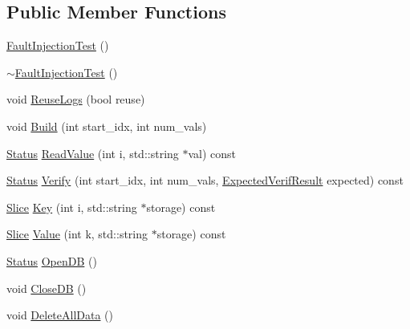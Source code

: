 \subsection*{Public Member Functions}
\begin{DoxyCompactItemize}
\item 
\mbox{\hyperlink{classleveldb_1_1_fault_injection_test_ae54ddb4aaf6bb2fb8dbd688164dd87f4}{Fault\+Injection\+Test}} ()
\item 
\mbox{\hyperlink{classleveldb_1_1_fault_injection_test_a547ba383f26947152eb0c5045d5965c1}{$\sim$\+Fault\+Injection\+Test}} ()
\item 
void \mbox{\hyperlink{classleveldb_1_1_fault_injection_test_ad89bbc5e5caf77e0c7a983005afe1dad}{Reuse\+Logs}} (bool reuse)
\item 
void \mbox{\hyperlink{classleveldb_1_1_fault_injection_test_aa387332893f14da9bdec0751e151f282}{Build}} (int start\+\_\+idx, int num\+\_\+vals)
\item 
\mbox{\hyperlink{classleveldb_1_1_status}{Status}} \mbox{\hyperlink{classleveldb_1_1_fault_injection_test_a0b40c46d524ef4ddd2415039e7f100a4}{Read\+Value}} (int i, std\+::string $\ast$val) const
\item 
\mbox{\hyperlink{classleveldb_1_1_status}{Status}} \mbox{\hyperlink{classleveldb_1_1_fault_injection_test_a2c29a68922ed25a3c15713fc4780c76e}{Verify}} (int start\+\_\+idx, int num\+\_\+vals, \mbox{\hyperlink{classleveldb_1_1_fault_injection_test_a5360c720d3ac8c6618f12400296feef9}{Expected\+Verif\+Result}} expected) const
\item 
\mbox{\hyperlink{classleveldb_1_1_slice}{Slice}} \mbox{\hyperlink{classleveldb_1_1_fault_injection_test_ab2599d1e090f74b7294715c8d676ff12}{Key}} (int i, std\+::string $\ast$storage) const
\item 
\mbox{\hyperlink{classleveldb_1_1_slice}{Slice}} \mbox{\hyperlink{classleveldb_1_1_fault_injection_test_a8922e4c2b543e52e42b513e8dffd65ae}{Value}} (int k, std\+::string $\ast$storage) const
\item 
\mbox{\hyperlink{classleveldb_1_1_status}{Status}} \mbox{\hyperlink{classleveldb_1_1_fault_injection_test_af81cf86b19e72e08bdee141a612e6b77}{Open\+DB}} ()
\item 
void \mbox{\hyperlink{classleveldb_1_1_fault_injection_test_ab0290ce2456f04e5309165196369e834}{Close\+DB}} ()
\item 
void \mbox{\hyperlink{classleveldb_1_1_fault_injection_test_a6e112ba6b03957228317818c0e91fa04}{Delete\+All\+Data}} ()
\item 

\end{DoxyCompactItemize}

